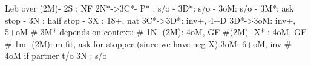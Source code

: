 Leb over (2M)-
2S : NF
2N*->3C*- P* : s/o
        - 3D*: s/o
        - 3oM: s/o
        - 3M*: ask stop
        - 3N : half stop
   - 3X : 18+, nat
3C*->3D*: inv+, 4+D
3D*->3oM: inv+, 5+oM
# 3M* depends on context: 
# 1N -(2M): 4oM, GF 
#(2M)- X* : 4oM, GF 
# 1m -(2M): m fit, ask for stopper (since we have neg X)
3oM: 6+oM, inv  # 4oM if partner t/o
3N : s/o